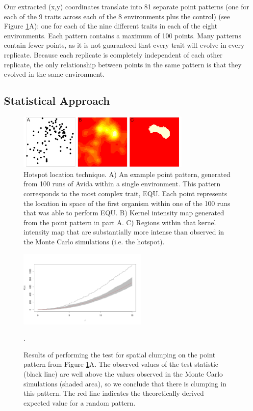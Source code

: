 Our extracted (x,y) coordinates translate into 81 separate point patterns (one for each of the 9 traits across each of the 8 environments plus the control) (see Figure \ref{stats}A): one for each of the nine different traits in each of the eight environments. Each pattern contains a maximum of 100 points. Many patterns contain fewer points, as it is not guaranteed that every trait will evolve in every replicate. Because each replicate is completely independent of each other replicate, the only relationship between points in the same pattern is that they evolved in the same environment.

\subsection{Statistical Approach}

\begin{figure}
\begin{center}
\includegraphics[width=3.35in]{figs/statsfig_horziontal_1col.png}
\caption{Hotspot location technique. A) An example point pattern, generated from 100 runs of Avida within a single environment. This pattern corresponds to the most complex trait, EQU. Each point represents the location in space of the first organism within one of the 100 runs that was able to perform EQU. B) Kernel intensity map generated from the point pattern in part A. C) Regions within that kernel intensity map that are substantially more intense than observed in the Monte Carlo simulations (i.e. the hotspot).}
\label{stats}
\end{center}
\end{figure}
\begin{figure}[t]
\begin{center}
\includegraphics[width=2.5in]{figs/9_50013_k-hat.png}
\caption{Results of performing the test for spatial clumping on the point pattern from Figure \ref{stats}A. The observed values of the test statistic (black line) are well above the values observed in the Monte Carlo simulations (shaded area), so we conclude that there is clumping in this pattern. The red line indicates the theoretically derived expected value for a random pattern.}. 
\label{khat}
\end{center}
\end{figure}

